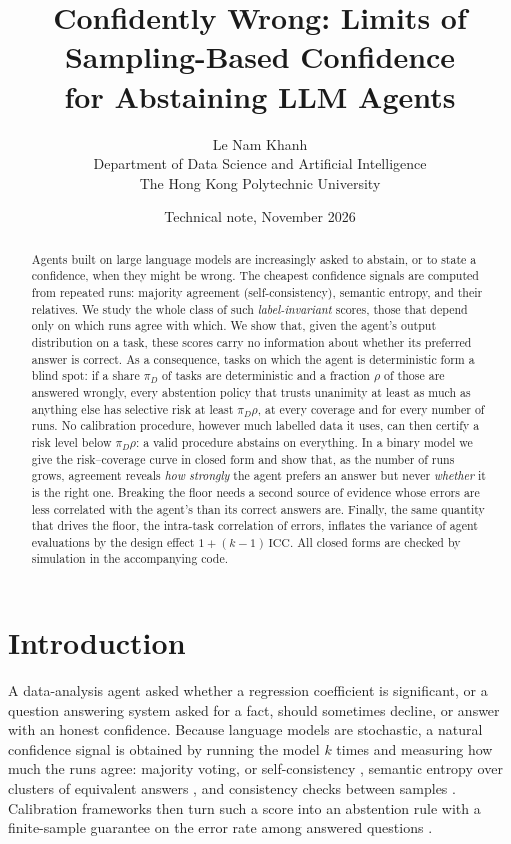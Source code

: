 \documentclass[11pt]{article}
\title{Confidently Wrong: Limits of Sampling-Based Confidence\\for Abstaining LLM Agents}
\author{Le Nam Khanh\\[2pt]
\small Department of Data Science and Artificial Intelligence\\
\small The Hong Kong Polytechnic University}
\date{Technical note, November 2026}
\theoremstyle{definition}
\begin{document}
\maketitle

\begin{abstract}
Agents built on large language models are increasingly asked to abstain, or to state a
confidence, when they might be wrong. The cheapest confidence signals are computed from repeated
runs: majority agreement (self-consistency), semantic entropy, and their relatives. We study the
whole class of such \emph{label-invariant} scores, those that depend only on which runs agree with
which. We show that, given the agent's output distribution on a task, these scores carry no
information about whether its preferred answer is correct. As a consequence, tasks on which the
agent is deterministic form a blind spot: if a share $\pi_D$ of tasks are deterministic and a
fraction $\rho$ of those are answered wrongly, every abstention policy that trusts unanimity at
least as much as anything else has selective risk at least $\pi_D\rho$, at every coverage and for
every number of runs. No calibration procedure, however much labelled data it uses, can then
certify a risk level below $\pi_D\rho$: a valid procedure abstains on everything. In a binary model
we give the risk--coverage curve in closed form and show that, as the number of runs grows,
agreement reveals \emph{how strongly} the agent prefers an answer but never \emph{whether} it is the
right one. Breaking the floor needs a second source of evidence whose errors are less correlated
with the agent's than its correct answers are. Finally, the same quantity that drives the floor,
the intra-task correlation of errors, inflates the variance of agent evaluations by the design
effect $1+(k-1)\,\mathrm{ICC}$. All closed forms are checked by simulation in the accompanying code.
\end{abstract}

\section{Introduction}

A data-analysis agent asked whether a regression coefficient is significant, or a question
answering system asked for a fact, should sometimes decline, or answer with an honest
confidence. Because language models are stochastic, a natural confidence signal is obtained by
running the model $k$ times and measuring how much the runs agree: majority voting, or
self-consistency \citep{wang2023selfconsistency}, semantic entropy over clusters of equivalent
answers \citep{kuhn2023semantic,farquhar2024detecting}, and consistency checks between samples
\citep{manakul2023selfcheckgpt}. Calibration frameworks then turn such a score into an abstention
rule with a finite-sample guarantee on the error rate among answered questions
\citep{angelopoulos2021ltt,angelopoulos2024crc,yadkori2024conformal}.
\end{document}
